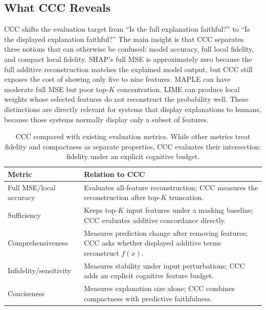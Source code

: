 \documentclass[sigconf,nonacm]{acmart}
\begin{document}
\subsection{What CCC Reveals}
CCC shifts the evaluation target from ``Is the full explanation faithful?'' to
``Is the displayed explanation faithful?'' The main insight is that CCC separates
three notions that can otherwise be confused: model accuracy, full local fidelity,
and compact local fidelity. SHAP's full MSE is approximately zero because the full
additive reconstruction matches the explained model output, but CCC still exposes
the cost of showing only five to nine features. MAPLE can have moderate full MSE
but poor top-$K$ concentration. LIME can produce local weights whose selected
features do not reconstruct the probability well. These distinctions are directly
relevant for systems that display explanations to humans, because those systems
normally display only a subset of features.

\begin{table}[t]
  \caption{CCC compared with existing evaluation metrics. While other metrics
  treat fidelity and compactness as separate properties, CCC evaluates their
  intersection: fidelity under an explicit cognitive budget.}
  \label{tab:ccc-comparison}
  \centering
  \footnotesize
  \setlength{\tabcolsep}{4pt}
  \renewcommand{\arraystretch}{1.12}
  \begin{tabular}{@{}p{}p{}@{}}
    \toprule
    Metric & Relation to CCC \\
    \midrule
    Full MSE/local accuracy & Evaluates all-feature reconstruction; CCC measures the reconstruction after top-$K$ truncation. \\
    Sufficiency & Keeps top-$K$ input features under a masking baseline; CCC evaluates additive concordance directly. \\
    Comprehensiveness & Measures prediction change after removing features; CCC asks whether displayed additive terms reconstruct $f(x)$. \\
    Infidelity/sensitivity & Measures stability under input perturbations; CCC adds an explicit cognitive feature budget. \\
    Conciseness & Measures explanation size alone; CCC combines compactness with predictive faithfulness. \\
    \bottomrule
  \end{tabular}
\end{table}
\end{document}
